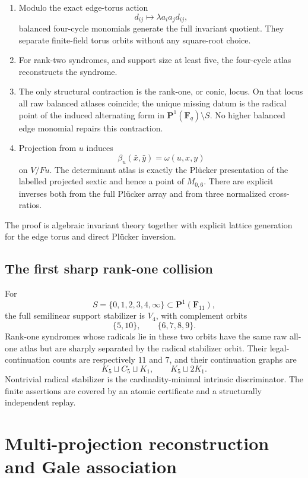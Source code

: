 \documentclass[11pt]{article}
\newcommand{\F}{\mathbf F}
\begin{document}
\begin{enumerate}
\item Modulo the exact edge-torus action
\[
 d_{ij}\longmapsto \lambda a_i a_jd_{ij},
\]
balanced four-cycle monomials generate the full invariant quotient.  They
separate finite-field torus orbits without any square-root choice.

\item For rank-two syndromes, and support size at least five, the four-cycle
atlas reconstructs the syndrome.

\item The only structural contraction is the rank-one, or conic, locus.  On
that locus all raw balanced atlases coincide; the unique missing datum is
the radical point of the induced alternating form in
$\mathbf P^1(\F_q)\setminus S$.  No higher balanced edge monomial repairs
this contraction.

\item Projection from $u$ induces
\[
 \beta_u(\bar x,\bar y)=\omega(u,x,y)
\]
on $V/Fu$.  The determinant atlas is exactly the Pl\"ucker presentation of
the labelled projected sextic and hence a point of $M_{0,6}$.  There are
explicit inverses both from the full Pl\"ucker array and from three
normalized cross-ratios.
\end{enumerate}

The proof is algebraic invariant theory together with explicit lattice
generation for the edge torus and direct Pl\"ucker inversion.

\subsection{The first sharp rank-one collision}

For
\[
 S=\{0,1,2,3,4,\infty\}\subset\mathbf P^1(\F_{11}),
\]
the full semilinear support stabilizer is $V_4$, with complement orbits
\[
 \{5,10\},\qquad \{6,7,8,9\}.
\]
Rank-one syndromes whose radicals lie in these two orbits have the same
raw all-one atlas but are sharply separated by the radical stabilizer
orbit.  Their legal-continuation counts are respectively $11$ and $7$,
and their continuation graphs are
\[
 K_5\sqcup C_5\sqcup K_1,\qquad K_5\sqcup2K_1.
\]
Nontrivial radical stabilizer is the cardinality-minimal intrinsic
discriminator.  The finite assertions are covered by an atomic certificate
and a structurally independent replay.

\section{Multi-projection reconstruction and Gale association}
\end{document}
